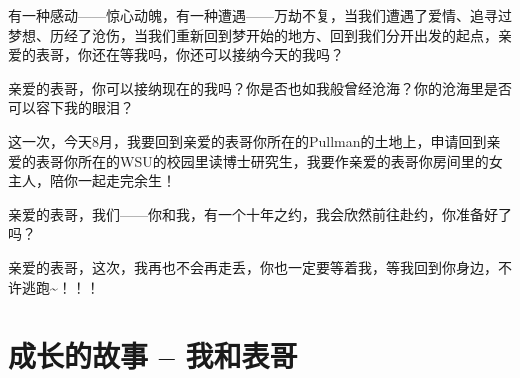 \documentclass[9pt, b5paper]{article}
\begin{document}
有一种感动——惊心动魄，有一种遭遇——万劫不复，当我们遭遇了爱情、追寻过梦想、历经了沧伤，当我们重新回到梦开始的地方、回到我们分开出发的起点，亲爱的表哥，你还在等我吗，你还可以接纳今天的我吗？

亲爱的表哥，你可以接纳现在的我吗？你是否也如我般曾经沧海？你的沧海里是否可以容下我的眼泪？

这一次，今天8月，我要回到亲爱的表哥你所在的Pullman的土地上，申请回到亲爱的表哥你所在的WSU的校园里读博士研究生，我要作亲爱的表哥你房间里的女主人，陪你一起走完余生！

亲爱的表哥，我们——你和我，有一个十年之约，我会欣然前往赴约，你准备好了吗？

亲爱的表哥，这次，我再也不会再走丢，你也一定要等着我，等我回到你身边，不许逃跑\textasciitilde{}！！！

\section{成长的故事 -- 我和表哥}
\label{sec:org54c7939}
\end{document}
